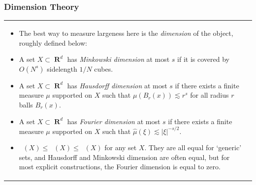\documentclass[handout,usenames,dvipsnames]{beamer}
\DeclareMathOperator{\RR}{\textbf{R}}
\DeclareMathOperator{\fordim}{\text{dim}_{\textbf{F}}}
\DeclareMathOperator{\hausdim}{\text{dim}_{\textbf{H}}}
\DeclareMathOperator{\minkdim}{\text{dim}_{\textbf{M}}}
\begin{document}
\begin{frame}
  \frametitle{Dimension Theory}

\begin{tabular}{p{}p{}}

\begin{itemize}
    \item The best way to measure largeness here is the \emph{dimension} of the object, roughly defined below:

    \item A set $X \subset \RR^d$ has \emph{Minkowski dimension} at most $s$ if it is covered by $O(N^s)$ sidelength $1/N$ cubes.

    \item A set $X \subset \RR^d$ has \emph{Hausdorff dimension} at most $s$ if there exists a finite measure $\mu$ supported on $X$ such that $\mu(B_r(x)) \lesssim r^s$ for all radius $r$ balls $B_r(x)$.

    \item A set $X \subset \RR^d$ has \emph{Fourier dimension} at most $s$ if there exists a finite measure $\mu$ supported on $X$ such that $\widehat{\mu}(\xi) \lesssim |\xi|^{-s/2}$.

    \item $\fordim(X) \leq \hausdim(X) \leq \minkdim(X)$ for any set $X$. They are all equal for `generic' sets, and Hausdorff and Minkowski dimension are often equal, but for most explicit constructions, the Fourier dimension is equal to zero.
\end{itemize}

\end{tabular}
\end{frame}
\end{document}
